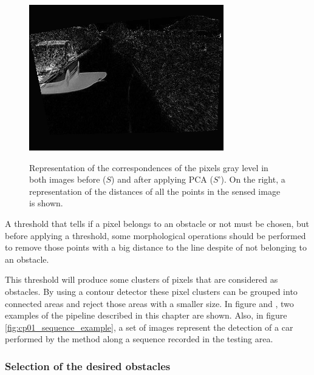 \begin{figure}[h!]
\begin{minipage}{0.3\textwidth}
\end{minipage}
\begin{minipage}{0.3\textwidth}
    \centering
    \includegraphics[width=\textwidth]{pca3}\label{fig:cp01_pca3}
\end{minipage}
\caption{Representation of the correspondences of the pixels gray level in both images before ($S$) and after applying PCA ($S’$). On the right, a representation of the distances of all the points in the sensed image is shown.}\label{fig:cp01_pca}
\end{figure}

A threshold that tells if a pixel belongs to an obstacle or not must be chosen, but before applying a threshold, some morphological operations should be performed to remove those points with a big distance to the line despite of not belonging to an obstacle.

This threshold will produce some clusters of pixels that are considered as obstacles. By using a contour detector these pixel clusters can be grouped into connected areas and reject those areas with a smaller size. In figure  and , two examples of the pipeline described in this chapter are shown. Also, in figure \ref{fig:cp01_sequence_example}, a set of images represent the detection of a car performed by the method along a sequence recorded in the testing area.

\subsubsection{Selection of the desired obstacles}\label{ch:chapter01_01_03_03}

